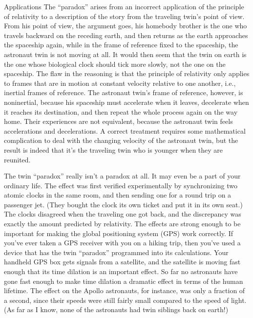 \begin{envsubsection}{Applications}
The ``paradox'' arises from an incorrect application of the
principle of relativity to a description of the story from the
traveling twin's point of view. From his point of view, the
argument goes, his homebody brother is the one who travels
backward on the receding earth, and then returns as the
earth approaches the spaceship again, while in the frame of
reference fixed to the spaceship, the astronaut twin is not
moving at all. It would then seem that the twin on earth is
the one whose biological clock should tick more slowly, not
the one on the spaceship. The flaw in the reasoning is that
the principle of relativity only applies to frames that are
in motion at constant velocity relative to one another, i.e.,
inertial frames of reference. The astronaut twin's frame of
reference, however, is noninertial, because his spaceship
must accelerate when it leaves, decelerate when it reaches
its destination, and then repeat the whole process again on
the way home. Their experiences are not equivalent, because
the astronaut twin feels accelerations and decelerations.
A correct treatment requires some mathematical complication
to deal with the changing velocity of the astronaut twin, but
the result is indeed that it's the traveling twin who is
younger when they are reunited.

The twin ``paradox'' really isn't a paradox at all. It may even
be a part of your ordinary life.
The effect was first verified experimentally by synchronizing
two atomic clocks in the same room, and then sending one for a round
trip on a passenger jet. (They bought the clock its own ticket and
put it in its own seat.) The
clocks disagreed when the traveling one got back, and the discrepancy
was exactly the amount predicted by relativity.
The effects are strong enough to
be important for making the global positioning system (GPS)
work correctly. If you've ever taken a GPS receiver with you on a hiking
trip, then you've used a device that has the twin ``paradox'' programmed
into its calculations. Your handheld GPS box gets signals from a satellite,
and the satellite is moving fast enough that its time dilation is an important
effect.
So far no astronauts have gone fast enough to make time
dilation a dramatic effect in terms of the human lifetime.
The effect on the Apollo
astronauts, for instance, was only a fraction of a second,
since their speeds were still fairly small compared to the
speed of light. (As far as I know, none of the astronauts
had twin siblings back on earth!)



\end{envsubsection}
